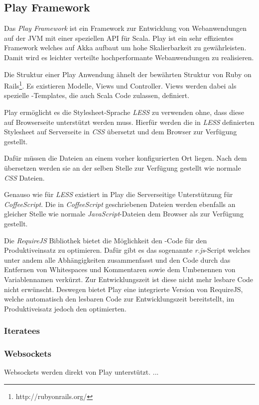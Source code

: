 \subsection{Play Framework}

Das \textit{Play Framework} ist ein Framework zur
Entwicklung von Webanwendungen  auf der JVM mit einer speziellen API für Scala. Play ist ein sehr
effizientes  Framework welches auf Akka aufbaut um hohe Skalierbarkeit zu gewährleisten. Damit wird
es leichter verteilte hochperformante Webanwendungen zu realisieren. 

Die Struktur einer Play Anwendung ähnelt der bewährten Struktur von Ruby on
Rails\footnote{http://rubyonrails.org/}. Es existieren Modelle, Views und Controller. Views werden
dabei als spezielle -Templates, die auch Scala Code zulassen, definiert.

Play ermöglicht es die Stylesheet-Sprache \textit{LESS} zu verwenden ohne,  dass diese auf
Browserseite unterstützt werden muss. Hierfür werden die in  \textit{LESS} definierten Stylesheet
auf Serverseite in \textit{CSS} übersetzt  und dem Browser zur Verfügung gestellt.

Dafür müssen die Dateien an einem vorher konfigurierten Ort liegen. Nach dem  übersetzen werden sie
an der selben Stelle zur Verfügung gestellt wie normale  \textit{CSS} Dateien.

Genauso wie für \textit{LESS} existiert in Play die Serverseitige Unterstützung  für
\textit{CoffeeScript}. Die in \textit{CoffeeScript} geschriebenen Dateien  werden ebenfalls an
gleicher Stelle wie normale \textit{JavaScript}-Dateien dem  Browser als  zur
Verfügung gestellt.


\label{sec:play}

Die \textit{RequireJS} Bibliothek bietet die Möglichkeit den  -Code für den
Produktiveinsatz zu optimieren. Dafür gibt es  das sogenannte \textit{r.js}-Script welches unter
andem alle Abhängigkeiten  zusammenfasst und den Code durch das Entfernen von Whitespaces und
Kommentaren  sowie dem Umbenennen von Variablennamen verkürzt. Zur Entwicklungszeit ist diese  nicht
mehr lesbare Code nicht erwünscht. Deswegen bietet Play eine integrierte  Version von RequireJS,
welche automatisch den lesbaren Code zur Entwicklungszeit  bereitstellt, im Produktiveisatz jedoch
den optimierten.

\subsubsection{Iteratees}


\subsubsection{Websockets}


Websockets werden direkt von Play unterstützt. ...